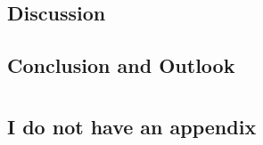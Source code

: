 \documentclass[UKenglish]{texmex/uiomasterthesis}
\begin{document}
\chapter{Discussion}

\chapter{Conclusion and Outlook}







\backmatter{}


\part*{}






\appendix




\chapter{I do not have an appendix}

\end{document}
